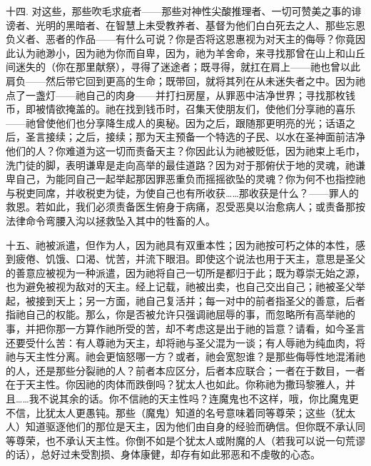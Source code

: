 十四. 对这些，那些吹毛求疵者——那些对神性尖酸推理者、一切可赞美之事的诽谤者、光明的黑暗者、在智慧上未受教养者、基督为他们白白死去之人、那些忘恩负义者、恶者的作品——有什么可说？你是否将这恩惠视为对天主的侮辱？你竟因此认为祂渺小，因为祂为你而自卑，因为，祂为羊舍命，来寻找那曾在山上和山丘间迷失的（你在那里献祭），寻得了迷途者；既寻得，就扛在肩上——祂也曾以此肩负——然后带它回到更高的生命；既带回，就将其列在从未迷失者之中。因为祂点了一盏灯——祂自己的肉身——并打扫房屋，从罪恶中洁净世界；寻找那枚钱币，即被情欲掩盖的。祂在找到钱币时，召集天使朋友们，使他们分享祂的喜乐——祂曾使他们也分享降生成人的奥秘。因为之后，跟随那更明亮的光；话语之后，圣言接续；之后，接续；那为天主预备一个特选的子民、以水在圣神面前洁净他们的人？你难道为这一切而责备天主？你因此认为祂被贬低，因为祂束上毛巾，洗门徒的脚，表明谦卑是走向高举的最佳道路？因为对于那俯伏于地的灵魂，祂谦卑自己，为能同自己一起举起那因罪恶重负而摇摇欲坠的灵魂？你为何不也指控祂与税吏同席，并收税吏为徒，为使自己也有所收获……那收获是什么？——罪人的救恩。若如此，我们必须责备医生俯身于病痛，忍受恶臭以治愈病人；或责备那按法律命令弯腰入沟以拯救坠入其中的牲畜的人。\par

十五、祂被派遣，但作为人，因为祂具有双重本性；因为祂按可朽之体的本性，感到疲倦、饥饿、口渴、忧苦，并流下眼泪。即使这个说法也用于天主，意思是圣父的善意应被视为一种派遣，因为祂将自己一切所是都归于此；既为尊崇无始之源，也为避免被视为敌对的天主。经上记载，祂被出卖，也自己交出自己；祂被圣父举起，被接到天上；另一方面，祂自己复活并；每一对中的前者指圣父的善意，后者指祂自己的权能。那么，你是否被允许只强调祂屈辱的事，而忽略所有高举祂的事，并把你那一方算作祂所受的苦，却不考虑这是出于祂的旨意？请看，如今圣言还要受什么苦：有人尊祂为天主，却将祂与圣父混为一谈；有人辱祂为纯血肉，将祂与天主性分离。祂会更恼怒哪一方？或者，祂会宽恕谁？是那些侮辱性地混淆祂的人，还是那些分裂祂的人？前者本应区分，后者本应联合；一者在于数目，一者在于天主性。你因祂的肉体而跌倒吗？犹太人也如此。你称祂为撒玛黎雅人，并且……我不说其余的话。你不信祂的天主性吗？连魔鬼也不这样，哦，你比魔鬼更不信，比犹太人更愚钝。那些（魔鬼）知道的名号意味着同等尊荣；这些（犹太人）知道驱逐他们的那位是天主，因为他们由自身的经验而确信。但你既不承认同等尊荣，也不承认天主性。你倒不如是个犹太人或附魔的人（若我可以说一句荒谬的话），总好过未受割损、身体康健，却存有如此邪恶和不虔敬的心态。\par

